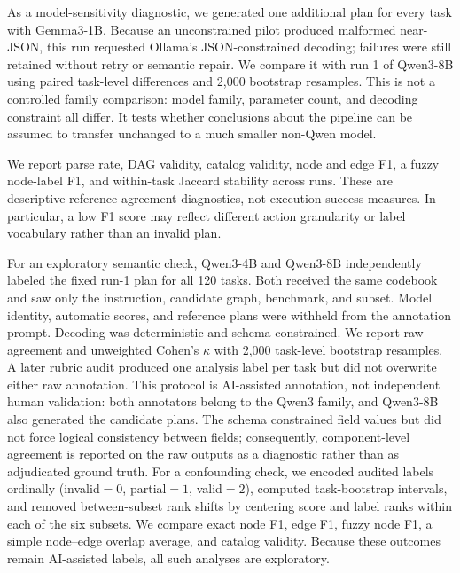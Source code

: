 \documentclass[10pt]{article}
\begin{document}
As a model-sensitivity diagnostic, we generated one additional plan for every
task with Gemma3-1B. Because an unconstrained pilot produced malformed
near-JSON, this run requested Ollama's JSON-constrained decoding; failures were
still retained without retry or semantic repair. We compare it with run 1 of
Qwen3-8B using paired task-level differences and 2,000 bootstrap resamples.
This is not a controlled family comparison: model family, parameter count, and
decoding constraint all differ. It tests whether conclusions about the pipeline
can be assumed to transfer unchanged to a much smaller non-Qwen model.

We report parse rate, DAG validity, catalog validity, node and edge F1, a fuzzy
node-label F1, and within-task Jaccard stability across runs. These are
descriptive reference-agreement diagnostics, not execution-success measures.
In particular, a low F1 score may reflect different action granularity or
label vocabulary rather than an invalid plan.

For an exploratory semantic check, Qwen3-4B and Qwen3-8B independently labeled
the fixed run-1 plan for all 120 tasks. Both received the same codebook and saw
only the instruction, candidate graph, benchmark, and subset. Model identity,
automatic scores, and reference plans were withheld from the annotation prompt.
Decoding was deterministic and schema-constrained. We report raw agreement and
unweighted Cohen's $\kappa$ with 2,000 task-level bootstrap resamples. A later
rubric audit produced one analysis label per task but did not overwrite either
raw annotation. This protocol is AI-assisted annotation, not independent human
validation: both annotators belong to the Qwen3 family, and Qwen3-8B also
generated the candidate plans.
The schema constrained field values but did not force logical consistency
between fields; consequently, component-level agreement is reported on the raw
outputs as a diagnostic rather than as adjudicated ground truth.
For a confounding check, we encoded audited labels ordinally
(invalid$=0$, partial$=1$, valid$=2$), computed task-bootstrap intervals, and
removed between-subset rank shifts by centering score and label ranks within
each of the six subsets. We compare exact node F1, edge F1, fuzzy node F1, a
simple node--edge overlap average, and catalog validity. Because these outcomes
remain AI-assisted labels, all such analyses are exploratory.
\end{document}
